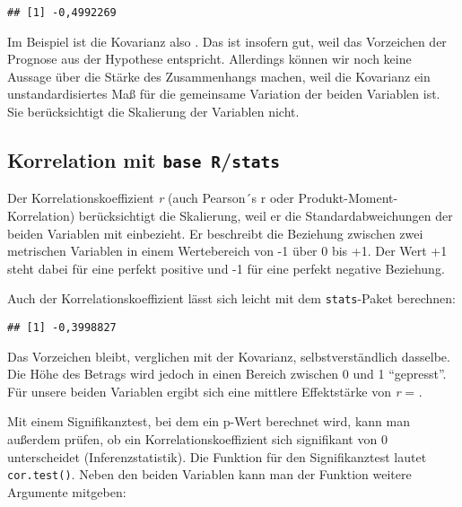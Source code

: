 \documentclass[
]{book}
\newenvironment{Shaded}{\begin{snugshade}}{\end{snugshade}}
\newcommand{\FunctionTok}[1]{\textcolor[rgb]{0.00,0.00,0.00}{#1}}
\newcommand{\NormalTok}[1]{#1}
\newcommand{\SpecialCharTok}[1]{\textcolor[rgb]{0.00,0.00,0.00}{#1}}
\begin{document}
\begin{verbatim}
## [1] -0,4992269
\end{verbatim}

Im Beispiel ist die Kovarianz also . Das ist insofern gut, weil das Vorzeichen der Prognose aus der Hypothese entspricht. Allerdings können wir noch keine Aussage über die Stärke des Zusammenhangs machen, weil die Kovarianz ein unstandardisiertes Maß für die gemeinsame Variation der beiden Variablen ist. Sie berücksichtigt die Skalierung der Variablen nicht.

\hypertarget{korrelation-mit-base-rstats}{%
\subsection{\texorpdfstring{Korrelation mit \texttt{base\ R}/\texttt{stats}}{Korrelation mit base R/stats}}\label{korrelation-mit-base-rstats}}

Der Korrelationskoeffizient \emph{r} (auch Pearson´s r oder Produkt-Moment-Korrelation) berücksichtigt die Skalierung, weil er die Standardabweichungen der beiden Variablen mit einbezieht. Er beschreibt die Beziehung zwischen zwei metrischen Variablen in einem Wertebereich von -1 über 0 bis +1. Der Wert +1 steht dabei für eine perfekt positive und -1 für eine perfekt negative Beziehung.

Auch der Korrelationskoeffizient lässt sich leicht mit dem \texttt{stats}-Paket berechnen:

\begin{Shaded}
\end{Shaded}

\begin{verbatim}
## [1] -0,3998827
\end{verbatim}

Das Vorzeichen bleibt, verglichen mit der Kovarianz, selbstverständlich dasselbe. Die Höhe des Betrags wird jedoch in einen Bereich zwischen 0 und 1 ``gepresst''. Für unsere beiden Variablen ergibt sich eine mittlere Effektstärke von \emph{r} = .

Mit einem Signifikanztest, bei dem ein p-Wert berechnet wird, kann man außerdem prüfen, ob ein Korrelationskoeffizient sich signifikant von 0 unterscheidet (Inferenzstatistik). Die Funktion für den Signifikanztest lautet \texttt{cor.test()}. Neben den beiden Variablen kann man der Funktion weitere Argumente mitgeben:
\end{document}
